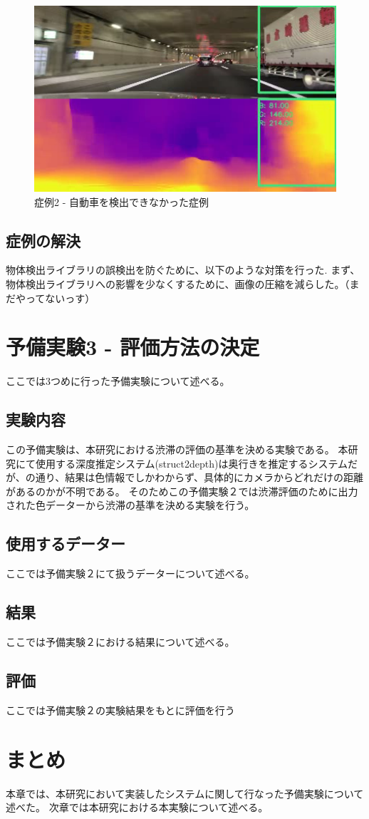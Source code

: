 \begin{figure}[hbtp]
 \begin{center}
  \includegraphics[width=12cm]{figs/miss_2.png}
 \end{center}
  \caption{症例2 - 自動車を検出できなかった症例}
  \label{fig:miss2}
\end{figure}

\newpage

\subsection{症例の解決}
物体検出ライブラリの誤検出を防ぐために、以下のような対策を行った.
まず、物体検出ライブラリへの影響を少なくするために、画像の圧縮を減らした。（まだやってないっす）


\newpage

\section{予備実験3 - 評価方法の決定}
ここでは3つめに行った予備実験について述べる。
\subsection{実験内容}
この予備実験は、本研究における渋滞の評価の基準を決める実験である。
本研究にて使用する深度推定システム(struct2depth)\cite{casser2019struct2depth}は奥行きを推定するシステムだが、の通り、結果は色情報でしかわからず、具体的にカメラからどれだけの距離があるのかが不明である。
そのためこの予備実験２では渋滞評価のために出力された色データーから渋滞の基準を決める実験を行う。

\subsection{使用するデーター}
ここでは予備実験２にて扱うデーターについて述べる。

\subsection{結果}
ここでは予備実験２における結果について述べる。

\subsection{評価}
ここでは予備実験２の実験結果をもとに評価を行う

\section{まとめ}
本章では、本研究において実装したシステムに関して行なった予備実験について述べた。
次章では本研究における本実験について述べる。